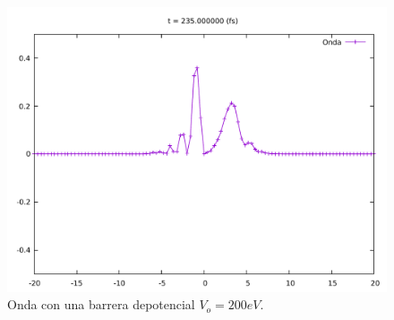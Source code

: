 \begin{figure}[H]
	\centering
	\includegraphics[scale=0.5]{../img/ej7-20.pdf}
	\caption{Onda con una barrera depotencial $V_o = 200eV$.}
	\label{ej7-20}
\end{figure}


